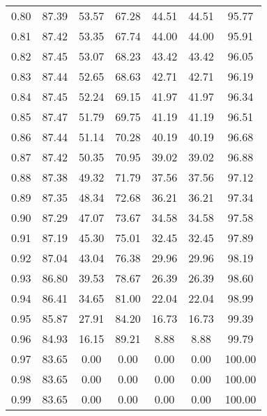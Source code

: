 \begin{tabular}{|c|c|c|c|c|c|c|}
      0.80 &     87.39 &     53.57 &      67.28 &   44.51 &      44.51 &         95.77 \\
      0.81 &     87.42 &     53.35 &      67.74 &   44.00 &      44.00 &         95.91 \\
      0.82 &     87.45 &     53.07 &      68.23 &   43.42 &      43.42 &         96.05 \\
      0.83 &     87.44 &     52.65 &      68.63 &   42.71 &      42.71 &         96.19 \\
      0.84 &     87.45 &     52.24 &      69.15 &   41.97 &      41.97 &         96.34 \\
      0.85 &     87.47 &     51.79 &      69.75 &   41.19 &      41.19 &         96.51 \\
      0.86 &     87.44 &     51.14 &      70.28 &   40.19 &      40.19 &         96.68 \\
      0.87 &     87.42 &     50.35 &      70.95 &   39.02 &      39.02 &         96.88 \\
      0.88 &     87.38 &     49.32 &      71.79 &   37.56 &      37.56 &         97.12 \\
      0.89 &     87.35 &     48.34 &      72.68 &   36.21 &      36.21 &         97.34 \\
      0.90 &     87.29 &     47.07 &      73.67 &   34.58 &      34.58 &         97.58 \\
      0.91 &     87.19 &     45.30 &      75.01 &   32.45 &      32.45 &         97.89 \\
      0.92 &     87.04 &     43.04 &      76.38 &   29.96 &      29.96 &         98.19 \\
      0.93 &     86.80 &     39.53 &      78.67 &   26.39 &      26.39 &         98.60 \\
      0.94 &     86.41 &     34.65 &      81.00 &   22.04 &      22.04 &         98.99 \\
      0.95 &     85.87 &     27.91 &      84.20 &   16.73 &      16.73 &         99.39 \\
      0.96 &     84.93 &     16.15 &      89.21 &    8.88 &       8.88 &         99.79 \\
      0.97 &     83.65 &      0.00 &       0.00 &    0.00 &       0.00 &        100.00 \\
      0.98 &     83.65 &      0.00 &       0.00 &    0.00 &       0.00 &        100.00 \\
      0.99 &     83.65 &      0.00 &       0.00 &    0.00 &       0.00 &        100.00 \\
\bottomrule
\end{tabular}
